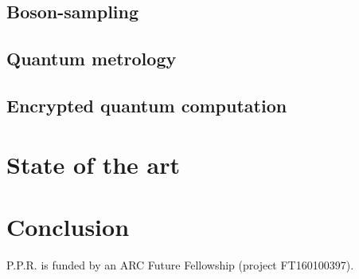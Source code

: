 \documentclass[aps,rmp,twocolumn,amsmath,amssymb,nofootinbib,superscriptaddress]{revtex4}
\newcommand{\comment}[1]{{\color{blue}{#1}}}
\begin{document}
\subsection{Boson-sampling}

\subsection{Quantum metrology}

\comment{Discuss NOON states - Heisenberg limited}

\comment{Discuss MORDOR scheme}

\subsection{Encrypted quantum computation}

\section{State of the art}

\comment{Discuss where experiments are at at the moment}

\section{Conclusion}

%
%

\begin{acknowledgments}
P.P.R. is funded by an ARC Future Fellowship (project FT160100397).
\end{acknowledgments}

%
%


\end{document}
